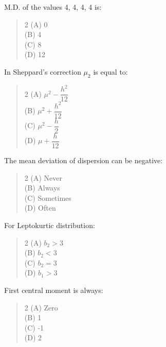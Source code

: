 \documentclass[11pt,a4paper]{article}
\begin{document}
\begin{mcqlist}
\item M.D. of the values 4, 4, 4, 4 is:
\begin{quote}\begin{multicols}{2}
\noindent (A) 0 \\
(B) 4 \\
(C) 8 \\
(D) 12
\end{multicols}\end{quote}

\item In Sheppard's correction $\mu_2$ is equal to:
\begin{quote}\begin{multicols}{2}
\noindent (A) $\mu^2 - \dfrac{h^2}{12}$ \\
(B) $\mu^2 + \dfrac{h^2}{12}$ \\
(C) $\mu^2 - \dfrac{h}{2}$ \\
(D) $\mu + \dfrac{h}{12}$
\end{multicols}\end{quote}

\item The mean deviation of dispersion can be negative:
\begin{quote}\begin{multicols}{2}
\noindent (A) Never \\
(B) Always \\
(C) Sometimes \\
(D) Often
\end{multicols}\end{quote}

\item For Leptokurtic distribution:
\begin{quote}\begin{multicols}{2}
\noindent (A) $b_2 > 3$ \\
(B) $b_2 < 3$ \\
(C) $b_2 = 3$ \\
(D) $b_1 > 3$
\end{multicols}\end{quote}

\item First central moment is always:
\begin{quote}\begin{multicols}{2}
\noindent (A) Zero \\
(B) 1 \\
(C) -1 \\
(D) 2
\end{multicols}\end{quote}


\end{mcqlist}
\end{document}
